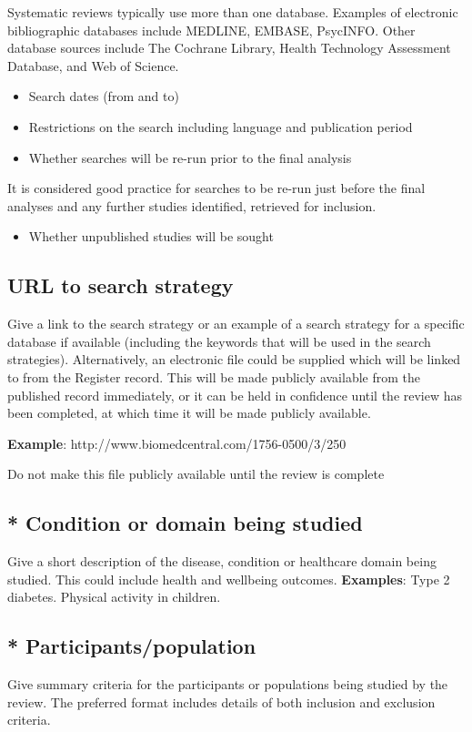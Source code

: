 \documentclass{qqtarticle}
\begin{document}
    Systematic reviews typically use more than one database. Examples of electronic bibliographic databases include
    MEDLINE, EMBASE, PsycINFO. Other database sources include The Cochrane Library, Health Technology Assessment
    Database, and Web of Science.
    \begin{itemize}
        \item Search dates (from and to)
        \item Restrictions on the search including language and publication period
        \item Whether searches will be re-run prior to the final analysis
    \end{itemize}

    It is considered good practice for searches to be re-run just before the final analyses and any further studies identified,
    retrieved for inclusion. 
    \begin{itemize}
        \item Whether unpublished studies will be sought
    \end{itemize}

    \subsection{URL to search strategy}
    Give a link to the search strategy or an example of a search strategy for a specific database if available (including the
    keywords that will be used in the search strategies).
    Alternatively, an electronic file could be supplied which will be linked to from the Register record. This will be made publicly
    available from the published record immediately, or it can be held in confidence until the review has been completed, at
    which time it will be made publicly available.

    \textbf{Example}: http://www.biomedcentral.com/1756-0500/3/250

    Do not make this file publicly available until the review is complete

    \subsection{* Condition or domain being studied}
    Give a short description of the disease, condition or healthcare domain being studied. This could include health and
    wellbeing outcomes.
    \textbf{Examples}: Type 2 diabetes. Physical activity in children.

    \subsection{* Participants/population}
    Give summary criteria for the participants or populations being studied by the review. The preferred format includes details
    of both inclusion and exclusion criteria.
\end{document}
